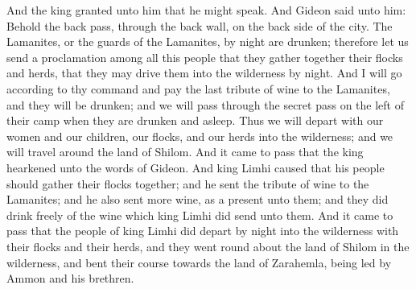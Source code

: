 And the king granted unto him that he might speak. And Gideon said unto him:
\bverse \iffalse Behold the back pass, through the back wall, on the back side of the city. The Lamanites, or the guards of the Lamanites, by night are drunken; therefore let us send a proclamation among all this people that they gather together their flocks and herds, that they may drive them into the wilderness by night. \fi
Behold the back pass, through the back wall, on the back side of the city. The Lamanites, or the guards of the Lamanites, by night are drunken; therefore let us send a proclamation among all this people that they gather together their flocks and herds, that they may drive them into the wilderness by night.
\bverse \iffalse And I will go according to thy command and pay the last tribute of wine to the Lamanites, and they will be drunken; and we will pass through the secret pass on the left of their camp when they are drunken and asleep. \fi
And I will go according to thy command and pay the last tribute of wine to the Lamanites, and they will be drunken; and we will pass through the secret pass on the left of their camp when they are drunken and asleep.
\bverse \iffalse Thus we will depart with our women and our children, our flocks, and our herds into the wilderness; and we will travel around the land of Shilom. \fi
Thus we will depart with our women and our children, our flocks, and our herds into the wilderness; and we will travel around the land of Shilom.
\bverse \iffalse And it came to pass that the king hearkened unto the words of Gideon. \fi
And it came to pass that the king hearkened unto the words of Gideon.
\bverse \iffalse And king Limhi caused that his people should gather their flocks together; and he sent the tribute of wine to the Lamanites; and he also sent more wine, as a present unto them; and they did drink freely of the wine which king Limhi did send unto them. \fi
And king Limhi caused that his people should gather their flocks together; and he sent the tribute of wine to the Lamanites; and he also sent more wine, as a present unto them; and they did drink freely of the wine which king Limhi did send unto them.
\bverse \iffalse And it came to pass that the people of king Limhi did depart by night into the wilderness with their flocks and their herds, and they went round about the land of Shilom in the wilderness, and bent their course towards the land of Zarahemla, being led by Ammon and his brethren. \fi
And it came to pass that the people of king Limhi did depart by night into the wilderness with their flocks and their herds, and they went round about the land of Shilom in the wilderness, and bent their course towards the land of Zarahemla, being led by Ammon and his brethren.
